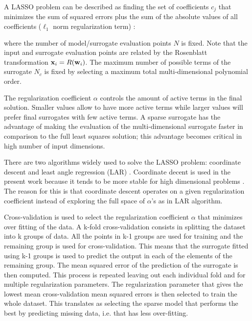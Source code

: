 \documentclass[preprint,12pt]{elsarticle}
\begin{document}
A LASSO problem can be described as finding the set of coefficients $c_j$ that minimizes the sum of squared errors plus the sum of the absolute values of all coefficients ($\ell_1$ norm regularization term) \cite{tibshirani1996regression}:



\noindent where the number of model/surrogate evaluation points $N$ is fixed. Note that the input and surrogate evaluation points are related by the Rosenblatt transformation $\mathbf{x}_i=R(\mathbf{w}_i)$. The maximum number of possible terms of the surrogate $N_c$ is fixed by selecting a maximum total multi-dimensional polynomial order.

The regularization coefficient $\alpha$ controls the amount of active terms in the final solution. Smaller values allow to have more active terms while larger values will prefer final surrogates with few active terms. A sparse surrogate has the advantage of making the evaluation of the multi-dimensional surrogate faster in comparison to the full least squares solution; this advantage becomes critical in high number of input dimensions.

There are two algorithms widely used to solve the LASSO problem: coordinate descent \cite{tibshirani1996regression} and least angle regression (LAR) \cite{blatman2011adaptive}. Coordinate decent is used in the present work because it tends to be more stable for high dimensional problems \cite{pedregosa2011scikit}. The reason for this is that coordinate descent operates on a given regularization coefficient instead of exploring the full space of $\alpha$'s as in LAR algorithm.


Cross-validation is used to select the regularization coefficient $\alpha$ that minimizes over fitting of the data. A k-fold cross-validation consists in splitting the dataset into k groups of data. All the points in k-1 groups are used for training and the remaining group is used for cross-validation. This means that the surrogate fitted using k-1 groups is used to predict the output in each of the elements of the remaining group. The mean squared error of the prediction of the surrogate is then computed. This process is repeated leaving out each individual fold and for multiple regularization parameters. The regularization parameter that gives the lowest mean cross-validation mean squared errors is then selected to train the whole dataset. This translates as selecting the sparse model that performs the best by predicting missing data, i.e. that has less over-fitting. 
\end{document}
